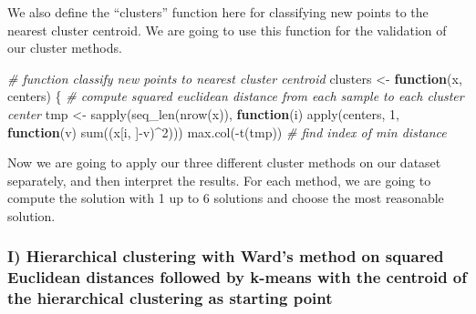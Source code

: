 \documentclass[
  11pt,
]{article}
\newenvironment{Shaded}{\begin{snugshade}}{\end{snugshade}}
\newcommand{\CommentTok}[1]{\textcolor[rgb]{0.56,0.35,0.01}{\textit{#1}}}
\newcommand{\ControlFlowTok}[1]{\textcolor[rgb]{0.13,0.29,0.53}{\textbf{#1}}}
\newcommand{\DecValTok}[1]{\textcolor[rgb]{0.00,0.00,0.81}{#1}}
\newcommand{\FunctionTok}[1]{\textcolor[rgb]{0.00,0.00,0.00}{#1}}
\newcommand{\NormalTok}[1]{#1}
\newcommand{\OtherTok}[1]{\textcolor[rgb]{0.56,0.35,0.01}{#1}}
\newcommand{\SpecialCharTok}[1]{\textcolor[rgb]{0.00,0.00,0.00}{#1}}
\begin{document}
\begin{Shaded}
\end{Shaded}

We also define the ``clusters'' function here for classifying new points to the nearest cluster centroid. We are going to use this function for the validation of our cluster methods.

\begin{Shaded}
\begin{Highlighting}[]
\CommentTok{\# function classify new points to nearest cluster centroid}
\NormalTok{clusters }\OtherTok{\textless{}{-}} \ControlFlowTok{function}\NormalTok{(x, centers) \{}
  \CommentTok{\# compute squared euclidean distance from each sample to each cluster center}
\NormalTok{  tmp }\OtherTok{\textless{}{-}} \FunctionTok{sapply}\NormalTok{(}\FunctionTok{seq\_len}\NormalTok{(}\FunctionTok{nrow}\NormalTok{(x)),}
                \ControlFlowTok{function}\NormalTok{(i) }\FunctionTok{apply}\NormalTok{(centers, }\DecValTok{1}\NormalTok{,}
                                  \ControlFlowTok{function}\NormalTok{(v) }\FunctionTok{sum}\NormalTok{((x[i, ]}\SpecialCharTok{{-}}\NormalTok{v)}\SpecialCharTok{\^{}}\DecValTok{2}\NormalTok{)))}
  \FunctionTok{max.col}\NormalTok{(}\SpecialCharTok{{-}}\FunctionTok{t}\NormalTok{(tmp))  }\CommentTok{\# find index of min distance}
\end{Highlighting}
\end{Shaded}

Now we are going to apply our three different cluster methods on our dataset separately, and then interpret the results. For each method, we are going to compute the solution with 1 up to 6 solutions and choose the most reasonable solution.

\hypertarget{i-hierarchical-clustering-with-wards-method-on-squared-euclidean-distances-followed-by-k-means-with-the-centroid-of-the-hierarchical-clustering-as-starting-point}{%
\subsubsection{I) Hierarchical clustering with Ward's method on squared Euclidean distances followed by k-means with the centroid of the hierarchical clustering as starting point}\label{i-hierarchical-clustering-with-wards-method-on-squared-euclidean-distances-followed-by-k-means-with-the-centroid-of-the-hierarchical-clustering-as-starting-point}}
\end{document}
